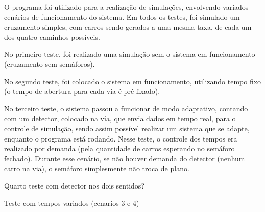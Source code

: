 O programa foi utilizado para a realização de simulações, envolvendo variados cenários de funcionamento do sistema.
Em todos os testes, foi simulado um cruzamento simples, com carros sendo gerados a uma mesma taxa, de cada um dos quatro caminhos possíveis.

No primeiro teste, foi realizado uma simulação sem o sistema em funcionamento (cruzamento sem semáforos).

No segundo teste, foi colocado o sistema em funcionamento, utilizando tempo fixo (o tempo de abertura para cada via é pré-fixado).

No terceiro teste, o sistema passou a funcionar de modo adaptativo, contando com um detector, colocado na via, que envia dados em tempo real, para o controle de simulação, sendo assim possível realizar um sistema que se adapte, enquanto o programa está rodando.
Nesse teste, o controle dos tempos era realizado por demanda (pela quantidade de carros esperando no semáforo fechado).
Durante esse cenário, se não houver demanda do detector (nenhum carro na via), o semáforo simplesmente não troca de plano.

Quarto teste com detector nos dois sentidos?

Teste com tempos variados (cenarios 3 e 4)



